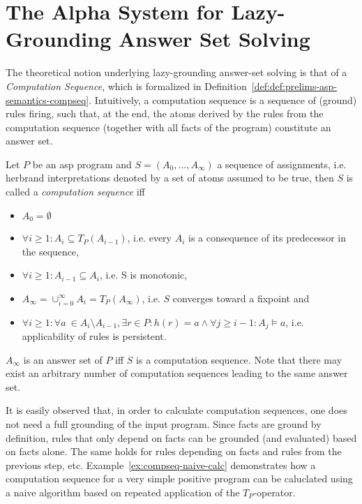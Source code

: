 \section{The Alpha System for Lazy-Grounding Answer Set Solving}

The theoretical notion underlying lazy-grounding answer-set solving is that of a \emph{Computation Sequence}, which is formalized in Definition~\ref{def:def:prelims-asp-semantics-compseq}. Intuitively, a computation sequence is a sequence of (ground) rules firing, such that, at the end, the atoms derived by the rules from the computation sequence (together with all facts of the program) constitute an answer set.

\begin{definition}
	\label{def:prelims-asp-semantics-compseq}
	Let $P$ be an \gls{asp} program and $S = (A_0,\ldots,A_{\infty})$ a sequence of assignments, i.e. herbrand interpretations denoted by a set of atoms assumed to be true, then $S$ is called a \emph{computation sequence} iff
	\begin{itemize}
		\item $A_0 = \emptyset$
		\item $\forall i \geq 1: A_i \subseteq T_P(A_{i - 1})$, i.e. every $A_i$ is a consequence of its predecessor in the sequence,
		\item $\forall i \geq 1: A_{i - 1} \subseteq A_{i}$, i.e. S is monotonic,
		\item $A_{\infty} = \cup^{\infty}_{i = 0} A_i = T_P(A_{\infty})$, i.e. $S$ converges toward a fixpoint and
		\item $\forall i \geq 1: \forall a \ \in A_i \setminus A_{i - 1}, \exists r \in P: h(r) = a \land \forall j \geq i - 1: A_j \models a$, i.e. applicability of rules is persistent.
	\end{itemize}
	$A_{\infty}$ is an answer set of $P$ iff $S$ is a computation sequence. Note that there may exist an arbitrary number of computation sequences leading to the same answer set.
\end{definition}

It is easily observed that, in order to calculate computation sequences, one does not need a full grounding of the input program. Since facts are ground by definition, rules that only depend on facts can be grounded (and evaluated) based on facts alone. The same holds for rules depending on facts and rules from the previous step, etc. Example~\ref{ex:compseq-naive-calc} demonstrates how a computation sequence for a very simple positive program can be caluclated using a naive algorithm based on repeated application of the $T_P$-operator.

